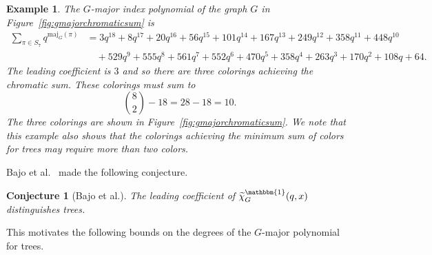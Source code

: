 \documentclass[11pt]{amsart}
\newtheorem{conjecture}[theorem]{Conjecture}
\newtheorem{exam}{Example}
\newenvironment{example}{\begin{exam}\sf}{\end{exam}}
\newcommand{\maj}{\mathrm{maj}}
\begin{document}
\begin{example}
    The $G$-major index polynomial of the graph $G$ in Figure~\ref{fig:gmajorchromaticsum} is 
    \begin{align*}
        \sum_{\pi \in S_7} q^{\maj_G(\pi)} &= 3q^{18} + 8q^{17} + 20q^{16} + 56q^{15} + 101q^{14} + 167q^{13} + 249q^{12} + 358q^{11} + 448q^{10} \\
        &\quad + 529q^{9} + 555q^8 + 561q^7 + 552q^6 + 470q^5 + 358q^4 + 263q^3 + 170q^2 + 108q + 64.
    \end{align*}
    The leading coefficient is $3$ and so there are three colorings achieving the chromatic sum.
    These colorings must sum to
    \[
        \binom{8}{2} - 18 = 28-18 = 10.
    \]
    The three colorings are shown in Figure~\ref{fig:gmajorchromaticsum}.
    We note that this example also shows that the colorings achieving the minimum sum of colors for trees may require more than two colors.
\end{example}

Bajo et al.~\cite{qchromatic} made the following conjecture.

\begin{conjecture}[Bajo et al.]\label{conj:tildechitrees}
The leading coefficient of $\widetilde{\chi}_G^\mathbbm{1}(q,x)$ distinguishes trees.
\end{conjecture}

This motivates the following bounds on the degrees of the $G$-major polynomial for trees. 
\end{document}
